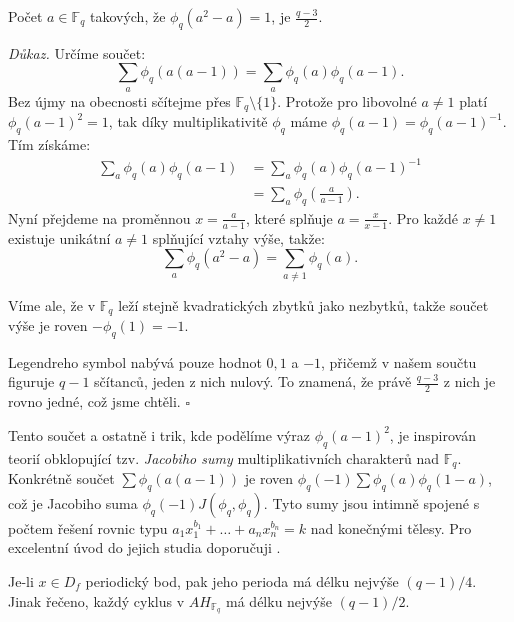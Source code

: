 \documentclass[12pt]{report}
\begin{document}

\begin{veta}
Počet $a \in \mathbb{F}_q$ takových, že $\phi_q ( a^2-a) = 1$, je $\frac{q-3}{2}$.
\end{veta}
\noindent \textit{Důkaz.} Určíme součet:
$$\sum_{a} \phi_q (a (a-1)) = \sum_{a} \phi_q (a) \phi_q (a-1).$$
Bez újmy na obecnosti sčítejme přes $\mathbb{F}_q \setminus \lbrace 1 \rbrace$. Protože pro libovolné $a \neq 1$ platí $\phi_q (a-1) ^2 = 1$, tak díky multiplikativitě $\phi_q$ máme $\phi_q (a-1) = \phi_q (a-1)^{-1}$. Tím získáme:
\begin{align*}
\sum_{a} \phi_q (a) \phi_q (a-1) &=  \sum_{a} \phi_q (a) \phi_q (a-1)^{-1}\\
&= \sum_{a} \phi_q \left (\frac{a}{a-1} \right).
\end{align*}
Nyní přejdeme na proměnnou $x = \frac{a}{a-1}$, které splňuje $a = \frac{x}{x-1}$. Pro každé $x \neq 1$ existuje unikátní $a \neq 1$ splňující vztahy výše, takže:
$$\sum_{a} \phi_q(a^2-a) = \sum_{a \neq 1} \phi_q(a).$$

Víme ale, že v $\mathbb{F}_q$ leží stejně kvadratických zbytků jako nezbytků, takže součet výše je roven $-\phi_q(1) = -1$.

Legendreho symbol nabývá pouze hodnot $0,1$ a $-1$, přičemž v našem součtu figuruje $q-1$ sčítanců, jeden z nich nulový. To znamená, že právě $\frac{q-3}{2}$ z nich je rovno jedné, což jsme chtěli. \hfill $\square$\\


\begin{poznamka}
Tento součet a ostatně i trik, kde podělíme výraz $\phi_q (a-1)^2$, je inspirován teorií obklopující tzv. \textit{Jacobiho sumy} multiplikativních charakterů nad $\mathbb{F}_q$. Konkrétně součet $\sum \phi_q (a(a-1))$ je roven $\phi_q (-1) \sum \phi_q (a) \phi_q (1-a)$, což je Jacobiho suma $\phi_q (-1) J(\phi_q, \phi_q)$. Tyto sumy jsou intimně spojené s počtem řešení rovnic typu $a_1 x_1 ^{b_1} + \dots + a_n x_n ^{b_n} = k$ nad konečnými tělesy. Pro excelentní úvod do jejich studia doporučuji \cite{Ireland}. 
\end{poznamka}


\begin{dusledek}
Je-li $x \in D_f$ periodický bod, pak jeho perioda má délku nejvýše $(q-1)/4$. Jinak řečeno, každý cyklus v $AH_{\mathbb{F}_q}$ má délku nejvýše $(q-1)/2$.
\end{dusledek}
\end{document}
